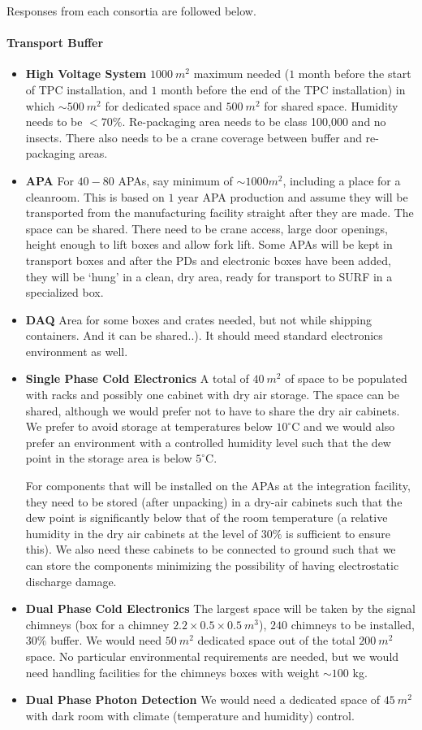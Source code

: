 \noindent Responses from each consortia are followed below.

\paragraph{\bf Transport Buffer}
\begin{itemize}
 \item {\bf High Voltage System} $1000~m^2$ maximum needed ($1$ month before the start of 
TPC installation, and $1$ month before the end of the TPC installation) in which
$\sim500~m^2$ for dedicated space and  $500~m^2$ for shared space. 
Humidity needs to be $<70\%$. Re-packaging area needs to be class 100,000
and no insects. There also needs to be a crane coverage between buffer and re-packaging areas.
  \item {\bf APA} For $40-80$ APAs, say 
minimum of $\sim1000m^2$, including a place for a cleanroom.
This is based on $1$ year APA production 
and assume they will be transported from the manufacturing facility straight after they are made.
The space can be shared.
There need to be crane access, large door openings, height enough to lift boxes and allow fork lift.
 Some APAs will be kept in transport boxes and after the PDs and electronic boxes have been added, 
they will be ‘hung’ in a clean, dry area, ready for transport to SURF in a specialized box.
  \item {\bf DAQ} Area for some boxes and crates needed, but not while shipping containers.
And it can be shared..). It should meed standard electronics environment as well.
  \item {\bf Single Phase Cold Electronics} A total of $40~m^2$ of space
to be populated with racks and possibly one cabinet with dry air storage.
The space can be shared, although we would prefer not to have to share the dry air cabinets.
We prefer to avoid storage at temperatures below $10^\circ$C and we would also prefer an environment with a controlled humidity level such that the dew point in the storage area 
is below $5^\circ$C. 

For components that will be installed on the APAs at the integration facility,
they need to be stored (after unpacking) in a dry-air cabinets such that the dew point is 
significantly below that of the room temperature (a relative humidity in the dry air cabinets at the 
level of $30\%$ is sufficient to ensure this). We also need these cabinets to be connected to ground 
such that we can store the components minimizing the possibility of having electrostatic discharge 
damage.
  \item {\bf Dual Phase Cold Electronics} The largest space will be taken by the signal chimneys (box for a chimney $2.2\times0.5\times0.5~m^3$), $240$ chimneys to be installed, $30\%$ buffer.
We would need $50~m^2$ dedicated space out of the total $200~m^2$ space.
No particular environmental requirements are needed, but we would need
handling facilities for the chimneys boxes with weight $\sim100$ kg.
   \item {\bf Dual Phase Photon Detection} We would need a dedicated space of
$45~m^2$ with dark room with climate (temperature and humidity) control.
\end{itemize}

